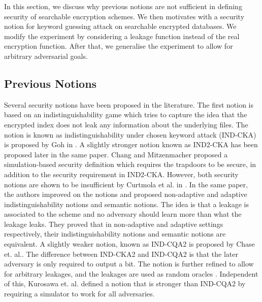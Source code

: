 In this section, we discuss why previous notions are not sufficient in defining security of searchable encryption schemes. We then motivates with a security notion for keyword guessing attack on searchable encrypted databases. We modify the experiment by considering a leakage function instead of the real encryption function. After that, we generalise the experiment to allow for arbitrary adversarial goals.



\subsection{Previous Notions}
Several security notions have been proposed in the literature. The first notion is based on an indistinguishability game which tries to capture the idea that the encrypted index does not leak any information about the underlying files. The notion is known as indistinguishability under chosen keyword attack (IND-CKA) is proposed by Goh in \cite{EPRINT:Goh03}. A slightly stronger notion known as IND2-CKA has been proposed later in the same paper. Chang and Mitzenmacher \cite{ACNS:ChaMit05} proposed a simulation-based security definition which requires the trapdoors to be secure, in addition to the security requirement in IND2-CKA. However, both security notions are shown to be insufficient by  Curtmola et al. in \cite{CCS:CGKO06}. In the same paper, the authors improved on the notions and proposed non-adaptive and adaptive indistinguishability notions and semantic notions. The idea is that a leakage is associated to the scheme and no adversary should learn more than what the leakage leaks. They proved that in non-adaptive and adaptive settings respectively, their indistinguishability notions and semantic notions are equivalent. A slightly weaker notion, known as IND-CQA2 is proposed by Chase et. al.\cite{AC:ChaKam10}. The difference between IND-CKA2 and IND-CQA2 is that the later adversary is only required to output a bit. The notion is further refined to allow for arbitrary leakages, and the leakages are used as random oracles \cite{EPRINT:KamPapRoe12, FC:KamPap13, NDSS:CJJJKR14}. Independent of this,  Kurosawa et. al.\cite{FC:KurOht12} defined a notion that is stronger than IND-CQA2 by requiring a simulator to work for all adversaries.


